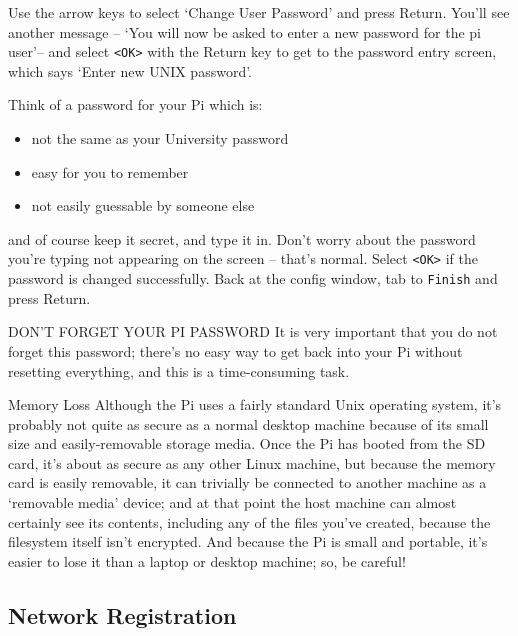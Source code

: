
Use the arrow keys to select `Change User Password' and press Return.
You'll see another message -- `You will now be asked to enter a new password for the pi user'--  and select \verb+<OK>+ with the Return key to get to the password entry screen, which says `Enter new UNIX password'.

Think of a password for your Pi which is:
\begin{itemize}
\item not the same as your University password
\item easy for you to remember
\item not easily guessable by someone else
\end{itemize}
 
and of course keep it secret, and type it in. Don't worry about the password you're typing not appearing on the screen -- that's normal. Select \verb+<OK>+ if the password is changed successfully. Back at the config window, tab to \verb+Finish+ and press Return. 

\begin{danger}{DON'T FORGET YOUR PI PASSWORD}
It is very important that you do not forget this password; there's no easy way to get back into your Pi without resetting everything, and this is a time-consuming task.
\end{danger}

\begin{danger}{Memory Loss}
Although the Pi uses a fairly standard Unix operating system, it's probably not quite as secure as a normal desktop machine because of its small size and easily-removable storage media. Once the Pi has booted from the SD card, it's about as secure as any other Linux machine, but because the memory card is easily removable, it can trivially be connected to another machine as a `removable media' device; and at that point the host machine can almost certainly see its contents, including any of the files you've created, because the filesystem itself isn't encrypted. And because the Pi is small and portable, it's easier to lose it than a laptop or desktop machine; so, be careful!
\end{danger}

\subsection{Network Registration}

